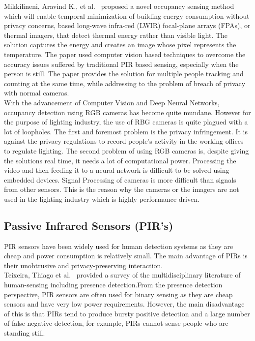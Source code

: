 Mikkilineni, Aravind K., et al.~\cite{mikkilineni2019novel} proposed a novel occupancy sensing method which will enable temporal minimization of building energy consumption without privacy concerns, based long-wave infra-red (LWIR) focal-plane arrays (FPAs), or thermal imagers, that detect thermal energy rather than visible light. The solution captures the energy and creates an image whose pixel represents the temperature.  The paper used computer vision based techniques to overcome the accuracy issues suffered by traditional PIR based sensing, especially when the person is still. The paper provides the solution for multiple people tracking and counting at the same time, while addressing to the problem of breach of privacy with normal cameras.
\\

With the advancement of Computer Vision and Deep Neural Networks, occupancy detection using RGB cameras has become quite mundane. However for the purpose of lighting industry, the use of RBG cameras is quite plagued with a lot of loopholes. The first and foremost problem is the privacy infringement. It is against the privacy regulations to record people's activity in the working offices to regulate lighting. The second problem of using RGB cameras is, despite giving the solutions real time, it needs a lot of computational power. Processing the video and then feeding it to a neural network is difficult to be solved using embedded devices. Signal Processing of cameras is more difficult than signals from other sensors.  This is the reason why the cameras or the imagers are not used in the lighting industry which is highly performance driven. 


\subsection{Passive Infrared Sensors (PIR's)}
PIR sensors have been widely used for human detection systems as they are cheap and power consumption is relatively small. The main advantage of PIRs is their unobtrusive and privacy-preserving interaction.
\\

Teixeira, Thiago et al.~\cite{teixeira2010survey} provided a survey of the multidisciplinary literature of human-sensing including presence detection.From the presence detection perspective, PIR sensors are often used for binary sensing as they are cheap sensors and have very low power requirements. However, the main
disadvantage of this is that PIRs tend to produce bursty positive detection and a large number of false negative
detection, for example, PIRs cannot sense people who are
standing still.
\\

